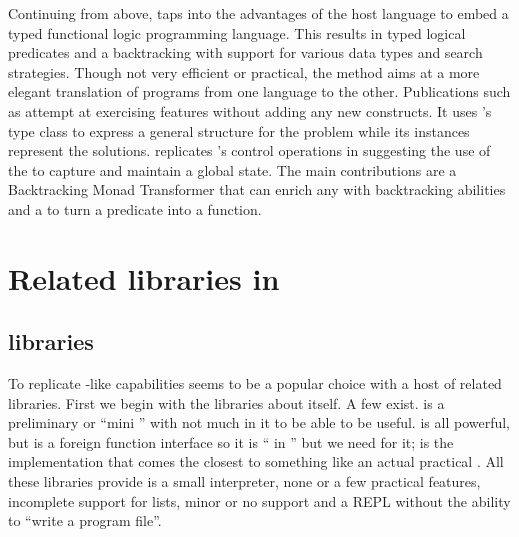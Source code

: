 \documentclass[thesis-solanki.tex]{subfiles}
\begin{document}
Continuing from above, \cite{claessen2000typed} taps into the advantages of the host language to embed a typed
functional logic programming language.
This results in typed logical predicates and a backtracking  with support for various data
types and search strategies.
Though not very efficient or practical,
the method aims at a more elegant translation of programs from one language
to the other.
Publications such as \cite{erwig2004escape} attempt at exercising  features without adding any new 
constructs. 
It uses 's type class to express a general structure for the problem while its instances
represent the solutions.
\cite{hinze1998prological} replicates 's control operations in  suggesting the
use of the   to capture and maintain a global state.
The main contributions are a Backtracking Monad Transformer that can enrich any  with
backtracking abilities and a  to turn a  predicate into a
 function.



\section{Related libraries in }
\subsection{ libraries}

To replicate -like
capabilities  seems to be a popular choice
with a host of related libraries.
First we begin with the libraries about  itself.
A few exist. \cite{nanoprolog-lib} is a preliminary or
``mini '' with not much in it to be able to be useful. \cite{hswip-lib}
is all powerful, but is a foreign function interface so it is `` in '' but we
need  for it;
\cite{prolog-lib}
is the implementation that comes the closest
to something like an actual practical .
All these libraries provide is a small interpreter, none or a few practical features, incomplete support for lists, minor or
no  support and a REPL without the ability to ``write a  program
file''.
\end{document}
